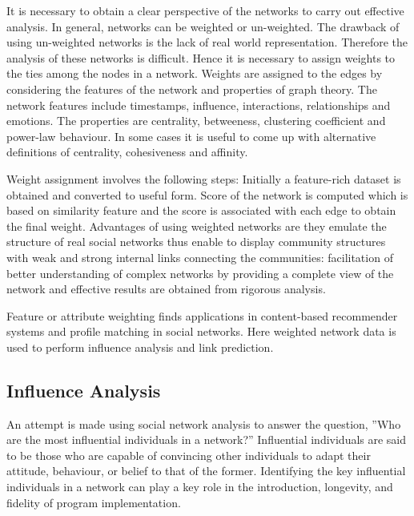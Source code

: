 It is necessary to obtain a clear perspective of the networks to carry out effective analysis. In general, networks can be weighted or un-weighted. The drawback of using un-weighted networks is the lack of real world representation. Therefore the analysis of these networks is difficult. Hence it is necessary to assign weights to the ties among the nodes in a network. Weights are assigned to the edges by considering the features of the network and properties of graph theory. The network features include timestamps, influence, interactions, relationships and emotions. The properties are centrality, betweeness, clustering coefficient and power-law behaviour. In some cases it is useful to come up with alternative definitions of centrality, cohesiveness and affinity. 

Weight assignment involves the following steps:
Initially a feature-rich dataset is obtained and converted to useful form. Score of the network is computed which is based on similarity feature and the score is associated with each edge to obtain the final weight. Advantages of using weighted networks are they emulate the structure of real social networks thus enable to display community structures with weak and strong internal links connecting the communities: facilitation of better understanding of complex networks by providing a complete view of the network and effective results are obtained from rigorous analysis. 

Feature or attribute weighting finds applications in content-based recommender systems and profile matching in social networks. Here weighted network data is used to perform influence analysis and link prediction. 

\subsection{Influence Analysis}

An attempt is made using social network analysis to answer the question, ”Who are the most influential individuals in a network?” Influential individuals are said to be those who are capable of convincing other individuals to adapt their attitude, behaviour, or belief to that of the former. Identifying the key influential individuals in a network can play a key role in the introduction, longevity, and fidelity of program implementation.

